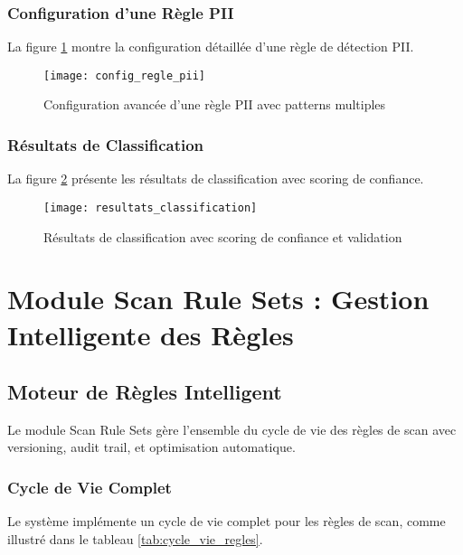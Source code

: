 \subsubsection{Configuration d'une Règle PII}

La figure \ref{fig:config_regle_pii} montre la configuration détaillée d'une règle de détection PII.

\begin{figure}[htpb]
\centering
\texttt{[image: config\_regle\_pii]}
\caption{Configuration avancée d'une règle PII avec patterns multiples}
\label{fig:config_regle_pii}
\end{figure}

\subsubsection{Résultats de Classification}

La figure \ref{fig:resultats_classification} présente les résultats de classification avec scoring de confiance.

\begin{figure}[htpb]
\centering
\texttt{[image: resultats\_classification]}
\caption{Résultats de classification avec scoring de confiance et validation}
\label{fig:resultats_classification}
\end{figure}

\section{Module Scan Rule Sets : Gestion Intelligente des Règles}

\subsection{Moteur de Règles Intelligent}

Le module Scan Rule Sets gère l'ensemble du cycle de vie des règles de scan avec versioning, audit trail, et optimisation automatique.

\subsubsection{Cycle de Vie Complet}

Le système implémente un cycle de vie complet pour les règles de scan, comme illustré dans le tableau \ref{tab:cycle_vie_regles}.

